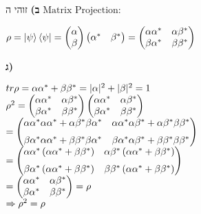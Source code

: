 \documentclass[14pt]{extarticle}
\makeatletter
\newenvironment{lefteqs}{%
    \begin{english}%
    \begin{flushleft}%
    \renewcommand{\arraystretch}{1.3}%
    $\begin{array}{@{}l@{}}%
}{%
    \end{array}$%
    \end{flushleft}%
    \end{english}%
}
\makeatother
\begin{document}
\textbf{ב)}
זוהי ה $\text{Matrix Projection}$:

\begin{lefteqs}
    \rho = \ket{\psi}\bra{\psi}
    = \begin{pmatrix}\alpha \\ \beta\end{pmatrix}
      \begin{pmatrix}\alpha^{*} & \beta^{*}\end{pmatrix}
    = \begin{pmatrix}
        \alpha \alpha^{*} & \alpha\beta^{*} \\
        \beta\alpha^{*}   & \beta\beta^{*}
      \end{pmatrix} \\
\end{lefteqs}

\textbf{ג)}

\begin{lefteqs}
    tr \rho = \alpha \alpha^{*} + \beta\beta^{*} = |\alpha|^2 + |\beta|^2 = 1 \\
    \rho^2 = \begin{pmatrix}
        \alpha\alpha^{*} & \alpha\beta^{*} \\
        \beta\alpha^{*} & \beta\beta^{*}
    \end{pmatrix}
    \begin{pmatrix}
        \alpha\alpha^{*} & \alpha\beta^{*} \\
        \beta\alpha^{*} & \beta\beta^{*}
    \end{pmatrix} \\
    = \begin{pmatrix}
    \alpha\alpha^{*}\alpha\alpha^{*}
    +
    \alpha\beta^{*}\beta\alpha^{*}
    &
    \alpha\alpha^{*}\alpha\beta^{*}
    +
    \alpha\beta^{*}\beta\beta^{*}
    \\[6pt]
    \beta\alpha^{*}\alpha\alpha^{*}
    +
    \beta\beta^{*}\beta\alpha^{*}
    &
    \beta\alpha^{*}\alpha\beta^{*}
    +
    \beta\beta^{*}\beta\beta^{*}
    \end{pmatrix} \\
    =
    \begin{pmatrix}
    \alpha\alpha^{*}\left(\alpha\alpha^{*}+\beta\beta^{*}\right)
    &
    \alpha\beta^{*}\left(\alpha\alpha^{*}+\beta\beta^{*}\right)
    \\[6pt]
    \beta\alpha^{*}\left(\alpha\alpha^{*}+\beta\beta^{*}\right)
    &
    \beta\beta^{*}\left(\alpha\alpha^{*}+\beta\beta^{*}\right)
    \end{pmatrix} \\
    =
    \begin{pmatrix}
    \alpha\alpha^{*} & \alpha\beta^{*} \\
    \beta\alpha^{*} & \beta\beta^{*}
    \end{pmatrix} = \rho \\
    \Rightarrow \rho^2 = \rho
\end{lefteqs}
\end{document}
